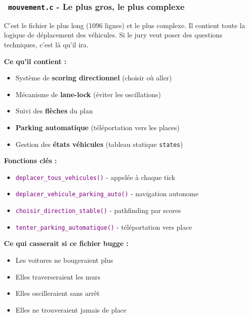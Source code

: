 \documentclass[11pt,a4paper]{article}
\newcommand{\fichier}[1]{\texttt{\textcolor{primary}{\faIcon{file-code} #1}}}
\newcommand{\fonction}[1]{\texttt{\textcolor{purple}{#1()}}}
\newcommand{\variable}[1]{\texttt{\textcolor{success}{#1}}}
\newcommand{\concept}[1]{\textcolor{primary}{\textbf{#1}}}
\begin{document}
\subsubsection{\fichier{mouvement.c} - Le plus gros, le plus complexe}

\begin{keybox}
C'est le fichier le plus long (1096 lignes) et le plus complexe. Il contient toute la logique de déplacement des véhicules. Si le jury veut poser des questions techniques, c'est là qu'il ira.
\end{keybox}

\textbf{Ce qu'il contient :}
\begin{itemize}[noitemsep]
    \item Système de \concept{scoring directionnel} (choisir où aller)
    \item Mécanisme de \concept{lane-lock} (éviter les oscillations)
    \item Suivi des \concept{flèches} du plan
    \item \concept{Parking automatique} (téléportation vers les places)
    \item Gestion des \concept{états véhicules} (tableau statique \variable{states})
\end{itemize}

\textbf{Fonctions clés :}
\begin{itemize}[noitemsep]
    \item \fonction{deplacer\_tous\_vehicules} - appelée à chaque tick
    \item \fonction{deplacer\_vehicule\_parking\_auto} - navigation autonome
    \item \fonction{choisir\_direction\_stable} - pathfinding par scores
    \item \fonction{tenter\_parking\_automatique} - téléportation vers place
\end{itemize}

\textbf{Ce qui casserait si ce fichier bugge :}
\begin{itemize}[noitemsep]
    \item Les voitures ne bougeraient plus
    \item Elles traverseraient les murs
    \item Elles oscilleraient sans arrêt
    \item Elles ne trouveraient jamais de place
\end{itemize}
\end{document}
